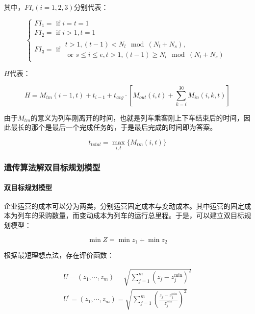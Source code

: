 其中，$FI_i(i=1,2,3)$分别代表：

\begin{equation*}
    \begin{cases}
        FI_1 = \text{ if } i = t = 1   \\
        FI_2 = \text{ if } i > 1, t = 1    \\
        FI_3 = \text{ if }\begin{matrix}
            t > 1, (t - 1) < N_l \mod (N_l + N_s),  \\
            \text{ or } s \leq i \leq e, t > 1, (t - 1) \geq N_l \mod (N_l + N_s)
            \end{matrix}
    \end{cases}
\end{equation*}

$H$代表：

\begin{equation*}
    H = M_{tm}(i - 1, t) + t_{i - 1} + t_{avg} \cdot \left[
			M_{out}(i, t) + \sum _{k = i} ^{30} M_{in}(i, k, t)
		\right]
\end{equation*}

由于$M_{tm}$的意义为列车刚离开的时间，也就是列车乘客刚上下车结束后的时间，因此最长的那个是最后一个完成任务的，于是最后完成的时间即为答案。

\begin{equation}
t_{total} = \max _{i, t} \{M_{tm}(i, t)\}
\end{equation}


\subsubsection{遗传算法解双目标规划模型}

\paragraph{双目标规划模型}

企业运营的成本可以分为两类，分别运营固定成本与变动成本。其中运营的固定成本为列车的采购数量，而变动成本为列车的运行总里程。于是，可以建立双目标规划模型\cite{caoJiyuchengkedengdaishijiandechengshiguidaojiaotongliecheshikebiaoyouhuamoxingyusuanfayanjiu2021}：

\begin{equation}
    \min Z = \min z_1 + \min z_2
\end{equation}

根据最短理想点法，存在评价函数：

\begin{align}
    U = (z_1, \cdots, z_m) = \sqrt{\sum_{j=1}^m(z_j-z_j^{\min})^2}  \\
    U^{'} = (z_1, \cdots, z_m) = \sqrt{
        \sum_{j=1}^m (
                \frac{z_j-z_j^{\min}}{z_j^{\min}}
            )^2
        }
\end{align}

